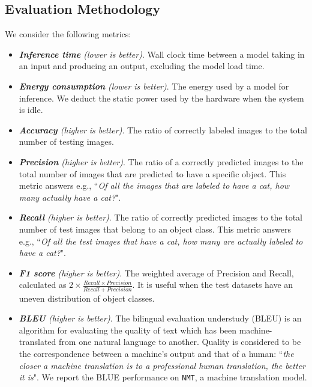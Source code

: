 

\subsection{Evaluation Methodology \label{sec:method}}
 We consider the following metrics:

\begin{itemize}
\item \emph{\textbf{Inference time} (lower is better)}. Wall clock time between a model taking in an input and producing an output,
    excluding the model load time.

\item \emph{\textbf{Energy consumption} (lower is better)}. The energy used by a model for inference.  We deduct the static power used by
    the hardware when the system is idle.

\item \emph{\textbf{Accuracy} (higher is better)}. The ratio of correctly labeled images to the total number of testing images.

\item \emph{\textbf{Precision} (higher is better)}. The ratio of a correctly predicted images to the total number of images that are
    predicted to have a specific object. This metric answers e.g., ``\emph{Of all the images that are labeled to have a cat, how many
    actually have a cat?}".

\item \emph{\textbf{Recall} (higher is better)}. The ratio of correctly predicted images to the total number of test images that belong
    to an object class. This metric answers e.g., ``\emph{Of all the test images that have a cat, how many are actually labeled to have a
    cat?}".

\item \emph{\textbf{F1 score} (higher is better)}.  The weighted average of Precision and Recall, calculated as $2\times\frac{Recall
    \times Precision} {Recall + Precision}$. It is useful when the test datasets have an uneven distribution of object classes.

\item \emph{\textbf{BLEU} (higher is better)}. The bilingual evaluation understudy (BLEU) is an algorithm for evaluating the quality of
    text which has been machine-translated from one natural language to another. Quality is considered to be the correspondence between a
    machine's output and that of a human: ``\emph{the closer a machine translation is to a professional human translation, the better it
    is}". We report the BLUE performance on \texttt{NMT}, a machine translation model.


\end{itemize}

